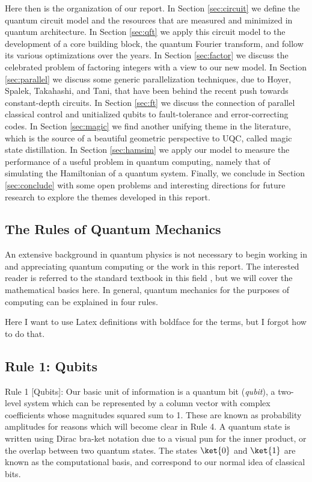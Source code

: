 Here then is the organization of our report.
In Section \ref{sec:circuit} we define the quantum circuit model and the
resources that are measured and minimized in quantum architecture. In
Section \ref{sec:qft} we apply this circuit model to the development of
a core building block, the quantum Fourier transform, and follow its
various optimizations over the years. In Section \ref{sec:factor} we
discuss the celebrated problem of factoring integers with a view to our new
model. In Section \ref{sec:parallel} we discuss some generic
parallelization techniques, due to Hoyer, Spalek, Takahashi, and Tani,
that have been behind the recent push towards constant-depth circuits.
In Section \ref{sec:ft} we discuss the connection of parallel classical
control and unitialized qubits to fault-tolerance and error-correcting codes.
In Section \ref{sec:magic} we find another unifying theme in the literature,
which is the source of a beautiful geometric perspective to UQC, called
magic state distillation. In Section \ref{sec:hamsim} we apply our model to
measure the performance of a useful problem in quantum computing,
namely that of simulating the Hamiltonian of a quantum system.
Finally, we conclude in Section \ref{sec:conclude} with some open problems
and interesting directions for future research to explore the themes developed
in this report.

\subsection{The Rules of Quantum Mechanics}

An extensive background in quantum physics is not necessary to begin
working in and appreciating quantum computing or the work in this report.
The interested reader is referred to the standard textbook in this field
\cite{Nielsen2000}, but we will cover the mathematical basics here.
In general, quantum mechanics for the purposes of computing can be
explained in four rules.

Here I want to use Latex definitions with boldface for the terms, but I
forgot how to do that.

\subsection{Rule 1: Qubits}

Rule 1 [Qubits]: Our basic unit of information is a quantum bit (\emph{qubit}),
a two-level system which can be represented by a column vector with
complex coefficients whose magnitudes squared sum to 1. These are known
as probability amplitudes for reasons which will become clear in Rule 4.
A quantum state
is written using Dirac bra-ket notation due to a visual pun for the
inner product, or the overlap between two quantum states.
The states $\ket{0}$ and $\ket{1}$ are known as the computational basis,
and correspond to our normal idea of classical bits.

